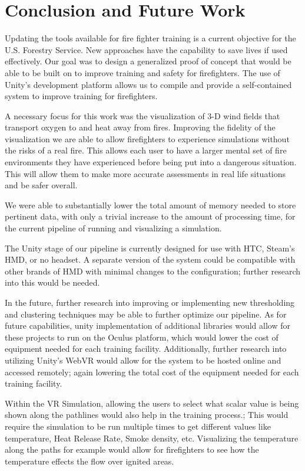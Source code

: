 
\chapter{Conclusion and Future Work} %

\label{Chapter4} %

Updating the tools available for fire fighter training is a current objective for the U.S. Forestry Service. New approaches have the capability to save lives if used effectively. Our goal was to design a generalized proof of concept that would be able to be built on to improve training and safety for firefighters. The use of Unity’s development platform allows us to compile and provide a self-contained system to improve training for firefighters. \par
A necessary focus for this work was the visualization of 3-D wind fields that transport oxygen to and heat away from fires. Improving the fidelity of the visualization we are able to allow firefighters to experience simulations without the risks of a real fire. This allows each user to have a larger mental set of fire environments they have experienced before being put into a dangerous situation. This will allow them to make more accurate assessments in real life situations and be safer overall. \par
We were able to substantially lower the total amount of memory needed to store pertinent data, with only a trivial increase to the amount of processing time, for the current pipeline of running and visualizing a simulation. \par
The Unity stage of our pipeline is currently designed for use with HTC, Steam’s HMD, or no headset. A separate version of the system could be compatible with other brands of HMD with minimal changes to the configuration; further research into this would be needed. \par
In the future, further research into improving or implementing new thresholding and clustering techniques may be able to further optimize our pipeline. As for future capabilities, unity implementation of additional libraries would allow for these projects to run on the Oculus platform, which would lower the cost of equipment needed for each training facility. Additionally, further research into utilizing Unity’s WebVR would allow for the system to be hosted online and accessed remotely; again lowering the total cost of the equipment needed for each training facility. \par
Within the VR Simulation, allowing the users to select what scalar value is being shown along the pathlines would also help in the training process.; This would require the simulation to be run multiple times to get different values like temperature, Heat Release Rate, Smoke density, etc. Visualizing the temperature along the paths for example would allow for firefighters to see how the temperature effects the flow over ignited areas.




